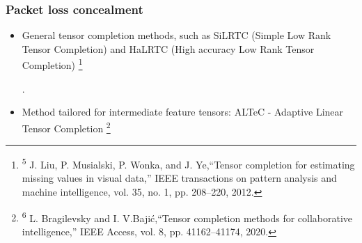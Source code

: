 \documentclass[aspectratio=169]{beamer}
\newcommand\blfootnote[1]{%
	\begingroup
	\renewcommand\thefootnote{}\footnote{#1}%
	\addtocounter{footnote}{-1}%
	\endgroup
}
\begin{document}
\begin{frame}
	\frametitle{Packet loss concealment}
	\begin{itemize}
		\item General tensor completion methods, such as SiLRTC (Simple Low Rank Tensor Completion) and HaLRTC (High accuracy Low Rank Tensor Completion) \cite{liu2012tensor}\blfootnote{\tiny \textsuperscript{5} J. Liu, P. Musialski, P. Wonka, and J. Ye,``Tensor completion for estimating missing values in visual data,” IEEE transactions on pattern analysis and machine intelligence, vol. 35, no. 1, pp. 208–220, 2012.}.
		\item Method tailored for intermediate feature tensors: ALTeC - Adaptive Linear Tensor Completion \cite{Bragile2020} \blfootnote{\tiny \textsuperscript{6} L. Bragilevsky and I. V.Bajić,``Tensor completion methods for collaborative intelligence,” IEEE Access, vol. 8, pp. 41162–41174, 2020.}
	\end{itemize}
\end{frame}
\end{document}
